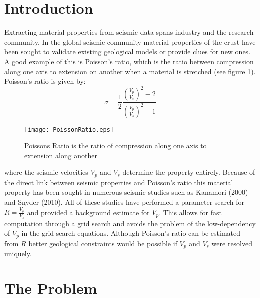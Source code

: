 \documentclass[jgrga]{agutex}
\begin{document}
%

\begin{article}

%
%
\section{Introduction}

Extracting material properties from seismic data spans industry and the research community. In the global seismic community material properties of the crust have been sought to validate existing geological models or provide clues for new ones. A good example of this is Poisson's ratio, which is the ratio between compression along one axis to extension on another when a material is stretched (see figure 1). Poisson's ratio is given by:
\begin{equation}
 \sigma = \frac{1}{2} \frac{ \left( \frac{ V_p }{ V_s } \right)^2 - 2 }{ \left( \frac{ V_p }{ V_s } \right)^2 - 1 }
\end{equation}

\begin{figure}
\noindent\texttt{[image: PoissonRatio.eps]}
\caption{Poissons Ratio is the ratio of compression along one axis to extension along another}
\end{figure}

where the seismic velocities $V_p$ and $V_s$ determine the property entirely. Because of the direct link between seismic properties and Poisson's ratio this material property has been sought in numerous seismic studies such as Kanamori (2000) and Snyder (2010). All of these studies have performed a parameter search for $R = \frac{V_p}{V_s}$ and provided a background estimate for $V_p$. This allows for fast computation through a grid search and avoids the problem of the low-dependency of $V_p$ in the grid search equations. Although Poisson's ratio can be estimated from $R$ better geological constraints would be possible if $V_p$ and $V_s$ were resolved uniquely. 

\section{The Problem}


\end{article}
\end{document}
